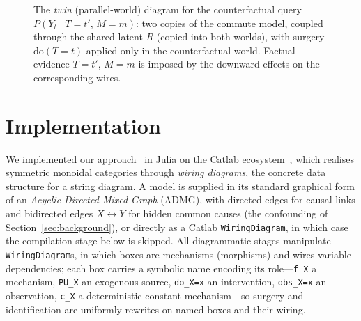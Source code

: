 \documentclass[runningheads]{llncs}
\begin{document}
\begin{figure}[t]
{%
}
\caption{The \emph{twin} (parallel-world) diagram for the counterfactual query $P(Y_t \mid T{=}t',\,M{=}m)$: two copies of the commute model, coupled through the shared latent $R$ (copied into both worlds), with surgery $\mathrm{do}(T{=}t)$ applied only in the counterfactual world. Factual evidence $T{=}t'$, $M{=}m$ is imposed by the downward effects on the corresponding wires.}
\label{fig:twin}
\end{figure}
\fi

\section{Implementation}\label{sec:implementation}

We implemented our approach~\cite{idcf_tool} in Julia on the Catlab ecosystem~\cite{catlab}, which realises symmetric monoidal categories through \emph{wiring diagrams}, the concrete data structure for a string diagram. A model is supplied in its standard graphical form of an \emph{Acyclic Directed Mixed Graph} (ADMG), with directed edges for causal links and bidirected edges $X\leftrightarrow Y$ for hidden common causes (the confounding of Section~\ref{sec:background}), or directly as a Catlab \texttt{WiringDiagram}, in which case the compilation stage below is skipped. All diagrammatic stages manipulate \texttt{WiringDiagram}s, in which boxes are mechanisms (morphisms) and wires variable dependencies; each box carries a symbolic name encoding its role---\texttt{f\_X} a mechanism, \texttt{PU\_X} an exogenous source, \texttt{do\_X=x} an intervention, \texttt{obs\_X=x} an observation, \texttt{c\_X} a deterministic constant mechanism---so surgery and identification are uniformly rewrites on named boxes and their wiring.
\end{document}

